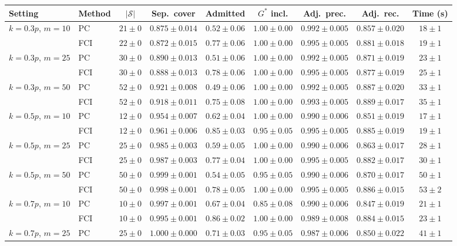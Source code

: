 \begin{tabular}{llccccccc}
\toprule
Setting & Method & $|\mathcal{S}|$ & Sep.\ cover & Admitted & $G^\ast$ incl. & Adj.\ prec. & Adj.\ rec. & Time (s) \\
\midrule
$k{=}0.3p$, $m{=}10$ & PC & $21\pm0$ & $0.875\pm0.014$ & $0.52\pm0.06$ & $1.00\pm0.00$ & $0.992\pm0.005$ & $0.857\pm0.020$ & $18\pm1$ \\
 & FCI & $22\pm0$ & $0.872\pm0.015$ & $0.77\pm0.06$ & $1.00\pm0.00$ & $0.995\pm0.005$ & $0.881\pm0.018$ & $19\pm1$ \\
$k{=}0.3p$, $m{=}25$ & PC & $30\pm0$ & $0.890\pm0.013$ & $0.51\pm0.06$ & $1.00\pm0.00$ & $0.992\pm0.005$ & $0.871\pm0.019$ & $23\pm1$ \\
 & FCI & $30\pm0$ & $0.888\pm0.013$ & $0.78\pm0.06$ & $1.00\pm0.00$ & $0.995\pm0.005$ & $0.877\pm0.019$ & $25\pm1$ \\
$k{=}0.3p$, $m{=}50$ & PC & $52\pm0$ & $0.921\pm0.008$ & $0.49\pm0.06$ & $1.00\pm0.00$ & $0.992\pm0.005$ & $0.887\pm0.020$ & $33\pm1$ \\
 & FCI & $52\pm0$ & $0.918\pm0.011$ & $0.75\pm0.08$ & $1.00\pm0.00$ & $0.993\pm0.005$ & $0.889\pm0.017$ & $35\pm1$ \\
$k{=}0.5p$, $m{=}10$ & PC & $12\pm0$ & $0.954\pm0.007$ & $0.62\pm0.04$ & $1.00\pm0.00$ & $0.990\pm0.006$ & $0.851\pm0.019$ & $17\pm1$ \\
 & FCI & $12\pm0$ & $0.961\pm0.006$ & $0.85\pm0.03$ & $0.95\pm0.05$ & $0.995\pm0.005$ & $0.885\pm0.019$ & $19\pm1$ \\
$k{=}0.5p$, $m{=}25$ & PC & $25\pm0$ & $0.985\pm0.003$ & $0.59\pm0.05$ & $1.00\pm0.00$ & $0.990\pm0.006$ & $0.863\pm0.017$ & $28\pm1$ \\
 & FCI & $25\pm0$ & $0.987\pm0.003$ & $0.77\pm0.04$ & $1.00\pm0.00$ & $0.995\pm0.005$ & $0.882\pm0.017$ & $30\pm1$ \\
$k{=}0.5p$, $m{=}50$ & PC & $50\pm0$ & $0.999\pm0.001$ & $0.54\pm0.05$ & $0.95\pm0.05$ & $0.990\pm0.006$ & $0.870\pm0.017$ & $50\pm1$ \\
 & FCI & $50\pm0$ & $0.998\pm0.001$ & $0.78\pm0.05$ & $1.00\pm0.00$ & $0.995\pm0.005$ & $0.886\pm0.015$ & $53\pm2$ \\
$k{=}0.7p$, $m{=}10$ & PC & $10\pm0$ & $0.997\pm0.001$ & $0.67\pm0.04$ & $0.85\pm0.08$ & $0.990\pm0.006$ & $0.847\pm0.019$ & $21\pm1$ \\
 & FCI & $10\pm0$ & $0.995\pm0.001$ & $0.86\pm0.02$ & $1.00\pm0.00$ & $0.989\pm0.008$ & $0.884\pm0.015$ & $23\pm1$ \\
$k{=}0.7p$, $m{=}25$ & PC & $25\pm0$ & $1.000\pm0.000$ & $0.71\pm0.03$ & $0.95\pm0.05$ & $0.987\pm0.006$ & $0.850\pm0.022$ & $41\pm1$ \\

\end{tabular}
